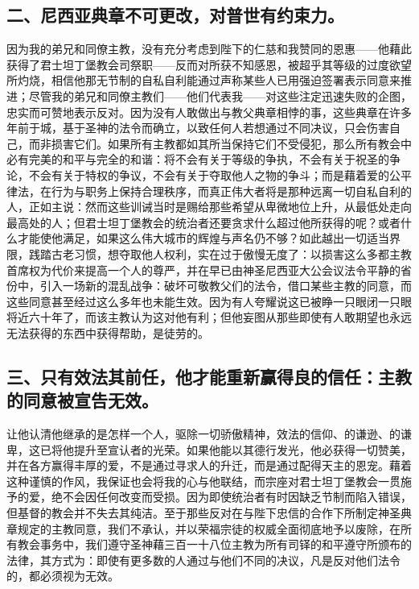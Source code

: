 
\subsection{二、尼西亚典章不可更改，对普世有约束力。}

因为我的弟兄和同僚主教，没有充分考虑到陛下的仁慈和我赞同的恩惠——他藉此获得了君士坦丁堡教会司祭职——反而对所获不知感恩，被超乎其等级的过度欲望所灼烧，相信他那无节制的自私自利能通过声称某些人已用强迫签署表示同意来推进；尽管我的弟兄和同僚主教们——他们代表我——对这些注定迅速失败的企图，忠实而可赞地表示反对。因为没有人敢做出与教父典章相悖的事，这些典章在许多年前于城，基于圣神的法令而确立，以致任何人若想通过不同决议，只会伤害自己，而非损害它们。如果所有主教都如其所当保持它们不受侵犯，那么所有教会中必有完美的和平与完全的和谐：将不会有关于等级的争执，不会有关于祝圣的争论，不会有关于特权的争议，不会有关于夺取他人之物的争斗；而是藉着爱的公平律法，在行为与职务上保持合理秩序，而真正伟大者将是那种远离一切自私自利的人，正如主说：然而这些训诫当时是赐给那些希望从卑微地位上升，从最低处走向最高处的人；但君士坦丁堡教会的统治者还要贪求什么超过他所获得的呢？或者什么才能使他满足，如果这么伟大城市的辉煌与声名仍不够？如此越出一切适当界限，践踏古老习惯，想夺取他人权利，实在过于傲慢无度了：以损害这么多都主教首席权为代价来提高一个人的尊严，并在早已由神圣尼西亚大公会议法令平静的省份中，引入一场新的混乱战争：破坏可敬教父们的法令，借口某些主教的同意，而这些同意甚至经过这么多年也未能生效。因为有人夸耀说这已被睁一只眼闭一只眼将近六十年了，而该主教认为这对他有利；但他妄图从那些即使有人敢期望也永远无法获得的东西中获得帮助，是徒劳的。\par


\subsection{三、只有效法其前任，他才能重新赢得良的信任：主教的同意被宣告无效。}

让他认清他继承的是怎样一个人，驱除一切骄傲精神，效法的信仰、的谦逊、的谦卑，这已将他提升至宣认者的光荣。如果他能以其德行发光，他必获得一切赞美，并在各方赢得丰厚的爱，不是通过寻求人的升迁，而是通过配得天主的恩宠。藉着这种谨慎的作风，我保证也会将我的心与他联结，而宗座对君士坦丁堡教会一贯施予的爱，绝不会因任何改变而受损。因为即使统治者有时因缺乏节制而陷入错误，但基督的教会并不失去其纯洁。至于那些反对在与陛下忠信的合作下所制定神圣典章规定的主教同意，我们不承认，并以荣福宗徒的权威全面彻底地予以废除，在所有教会事务中，我们遵守圣神藉三百一十八位主教为所有司铎的和平遵守所颁布的法律，其方式为：即使有更多数的人通过与他们不同的决议，凡是反对他们法令的，都必须视为无效。\par

